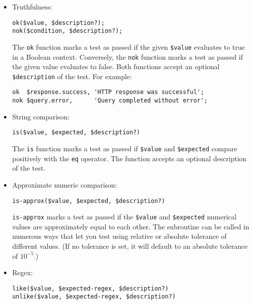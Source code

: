 \begin{itemize}
\item Truthfulness: 
\begin{verbatim}
ok($value, $description?); 
nok($condition, $description?);
\end{verbatim}

The {\tt ok} function marks a test as passed if the given 
\verb'$value' evaluates to true in a Boolean context. 
Conversely, the {\tt nok} function marks a test as passed 
if the given value evaluates to false. Both functions 
accept an optional \verb'$description' of the test. 
For example:

\begin{verbatim}
ok  $response.success, 'HTTP response was successful';
nok $query.error,      'Query completed without error';
\end{verbatim}

\item String comparison:
\begin{verbatim}
is($value, $expected, $description?)
\end{verbatim}

The {\tt is} function marks a test as passed if \verb'$value' 
and \verb'$expected' compare positively with the \verb'eq' 
operator. The function accepts an optional description 
of the test.

\item Approximate numeric comparison:

\begin{verbatim}
is-approx($value, $expected, $description?)
\end{verbatim}

{\tt is-approx} marks a test as passed if the \verb'$value' and 
\verb'$expected' numerical values are approximately equal 
to each other. The subroutine can be called in numerous ways 
that let you test using relative or absolute tolerance 
of different values. (If no tolerance is set, it will default 
to an absolute tolerance of $10^{-5}$.)

\item Regex:

\begin{verbatim}
like($value, $expected-regex, $description?)
unlike($value, $expected-regex, $description?)
\end{verbatim}


\end{itemize}
